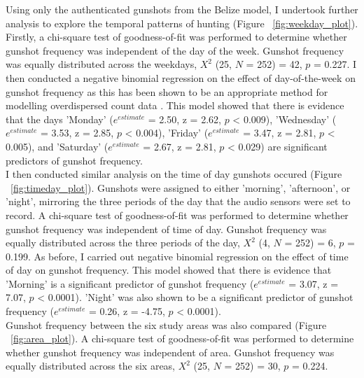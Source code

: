 Using only the authenticated gunshots from the Belize model, I undertook further analysis to explore the temporal patterns of hunting (Figure ~\ref{fig:weekday_plot}). Firstly, a chi-square test of goodness-of-fit was performed to determine whether gunshot frequency was independent of the day of the week. Gunshot frequency was equally distributed across the weekdays, $X^2$ (25, $N$ = 252) = 42, $p$ = 0.227. I then conducted a negative binomial regression on the effect of day-of-the-week on gunshot frequency as this has been shown to be an appropriate method for modelling overdispersed count data \citep{Zeilis2008}. This model showed that there is evidence that the days 'Monday' ($e^{estimate}$ = 2.50, z = 2.62, $p$ < 0.009), 'Wednesday' ($e^{estimate}$ = 3.53, z = 2.85, $p$ < 0.004), 'Friday' ($e^{estimate}$ = 3.47, z = 2.81, $p$ < 0.005), and 'Saturday' ($e^{estimate}$ = 2.67, z = 2.81, $p$ < 0.029) are significant predictors of gunshot frequency.  \\

\noindent I then conducted similar analysis on the time of day gunshots occured (Figure ~\ref{fig:timeday_plot}). Gunshots were assigned to either 'morning', 'afternoon', or 'night', mirroring the three periods of the day that the audio sensors were set to record. A chi-square test of goodness-of-fit was performed to determine whether gunshot frequency was independent of time of day. Gunshot frequency was equally distributed across the three periods of the day, $X^2$ (4, $N$ = 252) = 6, $p$ = 0.199. As before, I carried out negative binomial regression on the effect of time of day on gunshot frequency. This model showed that there is evidence that 'Morning' is a significant predictor of gunshot frequency ($e^{estimate}$ = 3.07, z = 7.07, $p$ < 0.0001). 'Night' was also shown to be a significant predictor of gunshot frequency ($e^{estimate}$ = 0.26, z = -4.75, $p$ < 0.0001). \\

\noindent Gunshot frequency between the six study areas was also compared (Figure ~\ref{fig:area_plot}). A chi-square test of goodness-of-fit was performed to determine whether gunshot frequency was independent of area. Gunshot frequency was equally distributed across the six areas, $X^2$ (25, $N$ = 252) = 30, $p$ = 0.224.

\begin{figure}\centering
{}\hfill
{}\par
{}
\caption{}
\label{fig}
\end{figure}




